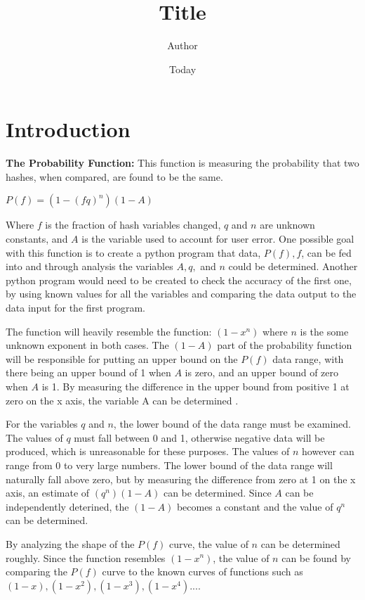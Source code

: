 \documentclass[]{report}
\begin{document}
\title{Title}
\author{Author}
\date{Today}


\section{Introduction}\label{sec:introduction}

\textbf{The Probability Function:}\newline
This function is measuring the probability that two hashes, when compared, are found to be the same.\newline
\begin{center}$P(f) = (1-(fq)^n)(1-A)$
\end{center}
Where $f$ is the fraction of hash variables changed, $q$ and $n$ are unknown constants, and $A$ is the variable used to account for user error.  One possible goal with this function is to create a python program that data, $P(f),f$, can be fed into and through analysis the variables $A,q,$ and $n$  could be determined. Another  python program would need to be created to check the accuracy of the first one, by using known values for all the variables and comparing the data output to the data input for the first program.   \par
The function will heavily resemble the function: $(1-x^n)$ where $n$ is the some unknown exponent in both cases. The $(1-A)$ part of the probability function will be responsible for putting an upper bound on the $P(f)$ data range, with there being an upper bound of 1 when $A$ is zero, and an upper bound of zero when $A$ is 1. By measuring the difference in the upper bound from positive 1 at zero on the x axis, the variable A can be determined . \par
 For the variables $q$ and $n$, the lower bound of the data range must be examined. The values of $q$ must fall between 0 and 1, otherwise negative data will be produced, which is unreasonable for these purposes. The values of $n
$ however can range from 0 to very large numbers. The lower bound of the data range will naturally fall above zero, but by measuring the difference from zero at 1 on the x axis, an estimate of $(q^n)(1-A)$ can be determined. Since $A$ can be independently deterined, the $(1-A)$ becomes a constant and the value of $q^n$ can be determined. \par 
By analyzing the shape of the $P(f)$ curve, the value of $n$ can be determined roughly. Since the function resembles $(1-x^n)$, the value of $n$ can be found by comparing the $P(f)$ curve to the known curves of functions such as $(1-x),(1-x^2),(1-x^3),(1-x^4)...$. \newline
\end{document}
